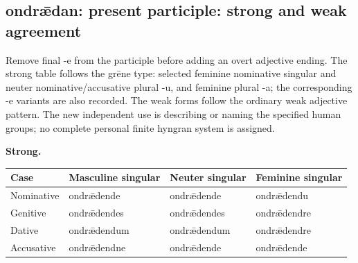 \par\begin{minipage}{\linewidth}\raggedright
\subsection*{ondrǣdan: present participle: strong and weak agreement}

Remove final -e from the participle before adding an overt adjective ending. The strong table follows the grēne type: selected feminine nominative singular and neuter nominative/\allowbreak{}accusative plural -u, and feminine plural -a; the corresponding -e variants are also recorded. The weak forms follow the ordinary weak adjective pattern. The new independent use is describing or naming the specified human groups; no complete personal finite hyngran system is assigned.

\textbf{Strong.}

\par\begingroup
\fontsize{10.5}{13.2}\selectfont
\setlength{\LTleft}{0pt}\setlength{\LTright}{\fill}
\noindent
\begin{tabular}{@{}>{\raggedright\arraybackslash}p{22.0mm}>{\raggedright\arraybackslash}p{31.188mm}>{\raggedright\arraybackslash}p{31.188mm}>{\raggedright\arraybackslash}p{31.188mm}@{}}
\toprule
\textbf{Case} & \textbf{Masculine singular} & \textbf{Neuter singular} & \textbf{Feminine singular} \\
\midrule
Nominative & ondrǣdende & ondrǣdende & ondrǣdendu \\
Genitive & ondrǣdendes & ondrǣdendes & ondrǣdendre \\
Dative & ondrǣdendum & ondrǣdendum & ondrǣdendre \\
Accusative & ondrǣdendne & ondrǣdende & ondrǣdende \\
\bottomrule
\end{tabular}
\par\endgroup
\end{minipage}\par
\par\addvspace{5pt}
